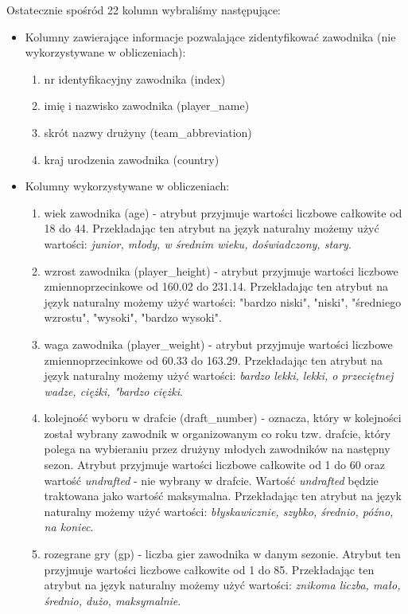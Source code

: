 \documentclass{classrep}
\begin{document}
\noindent Ostatecznie spośród 22 kolumn wybraliśmy następujące:
\begin{itemize}
    \item Kolumny zawierające informacje pozwalające zidentyfikować zawodnika (nie wykorzystywane w obliczeniach):
    \begin{enumerate}
        \item nr identyfikacyjny zawodnika (index)
        \item imię i nazwisko zawodnika (player\_name)
        \item skrót nazwy drużyny (team\_abbreviation)
        \item kraj urodzenia zawodnika (country)
    \end{enumerate}
    \item Kolumny wykorzystywane w obliczeniach:
    \begin{enumerate}
        \item wiek zawodnika (age) - atrybut przyjmuje wartości liczbowe całkowite od 18 do 44. Przekładając ten atrybut na język naturalny możemy użyć wartości: \textit{junior, młody, w średnim wieku, doświadczony, stary}. 
        \item wzrost zawodnika (player\_height) - atrybut przyjmuje wartości liczbowe zmiennoprzecinkowe od 160.02 do 231.14. Przekładając ten atrybut na język naturalny możemy użyć wartości: "bardzo niski", "niski", "średniego wzrostu", "wysoki", "bardzo wysoki".
        \item waga zawodnika (player\_weight) - atrybut przyjmuje wartości liczbowe zmiennoprzecinkowe od 60.33 do 163.29. Przekładając ten atrybut na język naturalny możemy użyć wartości: \textit{bardzo lekki, lekki, o przeciętnej wadze, ciężki, "bardzo ciężki}.
        \item kolejność wyboru w drafcie (draft\_number) - oznacza, który w kolejności został wybrany zawodnik w organizowanym co roku tzw. drafcie, który polega na wybieraniu przez drużyny młodych zawodników na następny sezon. Atrybut przyjmuje wartości liczbowe całkowite od 1 do 60 oraz wartość \textit{undrafted} - nie wybrany w drafcie. Wartość \textit{undrafted} będzie traktowana jako wartość maksymalna. Przekładając ten atrybut na język naturalny możemy użyć wartości: \textit{błyskawicznie, szybko, średnio, późno, na koniec}.
        \item rozegrane gry (gp) - liczba gier zawodnika w danym sezonie. Atrybut ten przyjmuje wartości liczbowe całkowite od 1 do 85.  Przekładając ten atrybut na język naturalny możemy użyć wartości: \textit{znikoma liczba, mało, średnio, dużo, maksymalnie}.

\end{enumerate}
\end{itemize}
\end{document}
